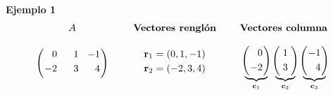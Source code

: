 {\begin{frame}
\begin{ej}{\textbf{Ejemplo 1}}
	\[
	\begin{array}{@{\hspace{0.1\tabcolsep}}c@{\hspace{4\tabcolsep}}c@{\hspace{4\tabcolsep}}c@{\hspace{0.1\tabcolsep}}}
	A & \text{\textbf{Vectores renglón}} & \text{\textbf{Vectores columna} }  \\[-8mm] 
	{\left(
		\begin{array}{@{\hspace{0.1\tabcolsep}}r@{\hspace{1.5\tabcolsep}}r@{\hspace{1.5\tabcolsep}}r@{\hspace{0.1\tabcolsep}}}
		 0 & \phantom{-}1 & -1 \\[1mm]
		-2 & 3 & 4 \\[1mm]
		\end{array}
		\right)
		\atop		
	}
	& 
	\begin{array}{@{\hspace{0.1\tabcolsep}}c@{\hspace{0.5\tabcolsep}}c@{\hspace{0.5\tabcolsep}}l@{\hspace{0.1\tabcolsep}}}
	\mathbf{r}_1 & = & (0,1,-1)\\[1mm]
	\mathbf{r}_2 & = & (-2,3,4)\\[6mm]
	\end{array}
	& 
	{
		\begin{array}{@{\hspace{0.1\tabcolsep}}c@{\hspace{1.3\tabcolsep}}c@{\hspace{1.3\tabcolsep}}c@{\hspace{0.1\tabcolsep}}}\\[8mm]
		\underbrace{\!\!
			\left(
			\begin{array}{@{\hspace{0.1\tabcolsep}}r@{\hspace{0.1\tabcolsep}}}
			0\\[1mm]
			-2
			\end{array}
			\right)
			\!\!}_{\mathbf{c}_1}
		& 
		\underbrace{\!\!
			\left(
			\begin{array}{@{\hspace{0.5\tabcolsep}}c@{\hspace{0.5\tabcolsep}}}
			1\\[1mm]
			3
			\end{array}
			\right)
			\!\!}_{\mathbf{c}_2}
		& 
		\underbrace{\!\!
			\left(
			\begin{array}{@{\hspace{0.1\tabcolsep}}r@{\hspace{0.1\tabcolsep}}}
			-1\\[1mm]
			4
			\end{array}
			\right)
			\!\!}_{\mathbf{c}_3}
		\end{array}
		\atop
	}				
	\end{array}		
	\]
\end{ej}	

\end{frame}
}

